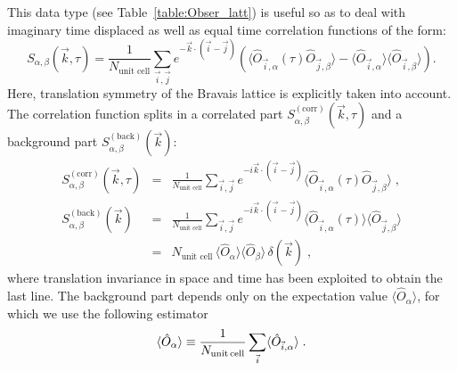 This data type (see Table~\ref{table:Obser_latt}) is useful so as to deal with  imaginary time displaced as well as equal time correlation functions of the form: 
\begin{equation}\label{eqn:s}
	S_{\alpha,\beta}(\vec{k},\tau) =   \frac{1}{N_{\text{unit cell}}} \sum_{\vec{i},\vec{j}}  e^{- \vec{k} \cdot \left( \vec{i}-\vec{j}\right) } \left( \langle \hat{O}_{\vec{i},\alpha} (\tau) \hat{O}_{\vec{j},\beta} \rangle  - 
	  \langle \hat{O}_{\vec{i},\alpha} \rangle \langle   \hat{O}_{\vec{i},\beta}  \rangle \right).
\end{equation}
Here,  translation symmetry of the Bravais lattice is explicitly taken into account. 
The correlation function splits in a correlated part $S_{\alpha,\beta}^{\mathrm{(corr)}}(\vec{k},\tau)$ and a background part $S_{\alpha,\beta}^{\mathrm{(back)}}(\vec{k})$:
\begin{eqnarray}
  S_{\alpha,\beta}^{\mathrm{(corr)}}(\vec{k},\tau)
  &=&
   \frac{1}{N_{\text{unit cell}}} \sum_{\vec{i},\vec{j}}  e^{- i\vec{k} \cdot \left( \vec{i}-\vec{j}\right) }  \langle \hat{O}_{\vec{i},\alpha} (\tau) \hat{O}_{\vec{j},\beta} \rangle\label{eqn:s_corr}\;,\\
         S_{\alpha,\beta}^{\mathrm{(back)}}(\vec{k})
  &=&
   \frac{1}{N_{\text{unit cell}}} \sum_{\vec{i},\vec{j}}  e^{- i\vec{k} \cdot \left( \vec{i}-\vec{j}\right) }  \langle \hat{O}_{\vec{i},\alpha} (\tau)\rangle \langle \hat{O}_{\vec{j},\beta} \rangle\nonumber\\
  &=& 
  N_{\text{unit cell}}\, \langle \hat{O}_{\alpha} \rangle \langle \hat{O}_{\beta} \rangle \, \delta(\vec{k})\label{eqn:s_back}\;,
\end{eqnarray}
where translation invariance in space and time has been exploited to obtain the last line. 
The background part depends only on the expectation value $\langle \hat{O}_{\alpha} \rangle$, for which we use the following estimator 
\begin{equation}\label{eqn:o}
\langle \hat{O}_{\alpha} \rangle \equiv \frac{1}{N_{\text{unit\,cell}}} \sum\limits_{\vec{i}} \langle \hat{O}_{\vec{i},\alpha} \rangle\;.
\end{equation}

